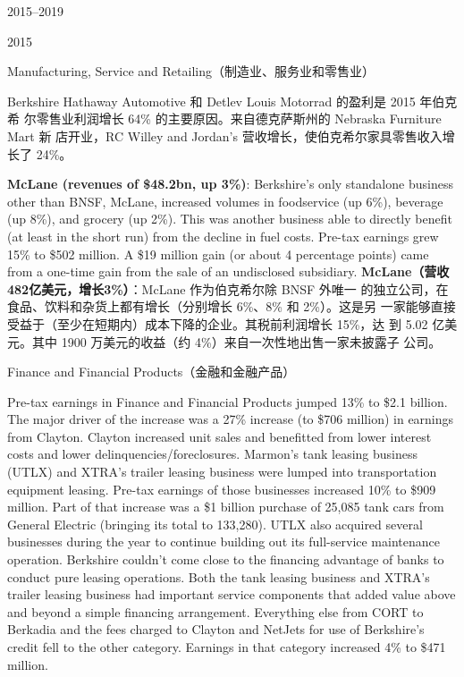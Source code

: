 \begin{chapter}{2015--2019}
\begin{section}{2015}
\begin{subsection}{Manufacturing, Service and Retailing（制造业、服务业和零售业）}
\begin{verseparallel}
{    Berkshire Hathaway Automotive 和 Detlev Louis Motorrad 的盈利是 2015 年伯克希
    尔零售业利润增长 64\% 的主要原因。来自德克萨斯州的 Nebraska Furniture Mart 新
    店开业，RC Willey and Jordan’s 营收增长，使伯克希尔家具零售收入增长了 24\%。

  }
\end{verseparallel}

\begin{verseparallel}
  {
    \textbf{McLane (revenues of \$48.2bn, up 3\%)}: Berkshire’s only standalone
    business other than BNSF, McLane, increased volumes in foodservice (up
    6\%), beverage (up 8\%), and grocery (up 2\%). This was another business
    able to directly benefit (at least in the short run) from the decline in fuel
    costs. Pre-tax earnings grew 15\% to \$502 million. A \$19 million gain (or
    about 4 percentage points) came from a one-time gain from the sale of an
    undisclosed subsidiary.
  }
  {
    \textbf{McLane（营收 482亿美元，增长3\%）}：McLane 作为伯克希尔除 BNSF 外唯一
    的独立公司，在食品、饮料和杂货上都有增长（分别增长 6\%、8\% 和 2\%）。这是另
    一家能够直接受益于（至少在短期内）成本下降的企业。其税前利润增长 15\%，达
    到 5.02 亿美元。其中 1900 万美元的收益（约 4\%）来自一次性地出售一家未披露子
    公司。
  }
\end{verseparallel}
\end{subsection}

\begin{subsection}{Finance and Financial Products（金融和金融产品）}
\begin{verseparallel}
  {
    Pre-tax earnings in Finance and Financial Products jumped 13\% to \$2.1
    billion. The major driver of the increase was a 27\% increase (to \$706
    million) in earnings from Clayton. Clayton increased unit sales and
    benefitted from lower interest costs and lower delinquencies/foreclosures.
    Marmon’s tank leasing business (UTLX) and XTRA’s trailer leasing business
    were lumped into transportation equipment leasing. Pre-tax earnings of those
    businesses increased 10\% to \$909 million. Part of that increase was a \$1
    billion purchase of 25,085 tank cars from General Electric (bringing its
    total to 133,280). UTLX also acquired several businesses during the year to
    continue building out its full-service maintenance operation. Berkshire
    couldn’t come close to the financing advantage of banks to conduct pure
    leasing operations. Both the tank leasing business and XTRA’s trailer
    leasing business had important service components that added value above and
    beyond a simple financing arrangement. Everything else from CORT to Berkadia
    and the fees charged to Clayton and NetJets for use of Berkshire’s credit
    fell to the other category. Earnings in that category increased 4\% to \$471
    million. \\
  }
  {

}
\end{verseparallel}
\end{subsection}
\end{section}
\end{chapter}
